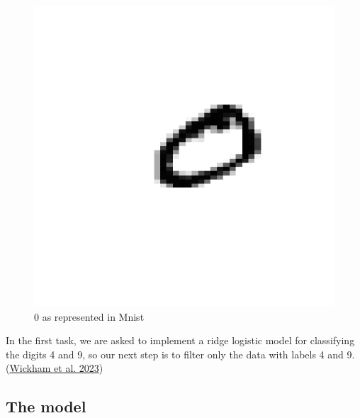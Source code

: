\documentclass[
  10pt,
]{article}
\newenvironment{Shaded}{\begin{snugshade}}{\end{snugshade}}
\newcommand{\CommentTok}[1]{\textcolor[rgb]{0.56,0.35,0.01}{\textit{#1}}}
\newcommand{\DecValTok}[1]{\textcolor[rgb]{0.00,0.00,0.81}{#1}}
\newcommand{\FunctionTok}[1]{\textcolor[rgb]{0.13,0.29,0.53}{\textbf{#1}}}
\newcommand{\NormalTok}[1]{#1}
\newcommand{\OtherTok}[1]{\textcolor[rgb]{0.56,0.35,0.01}{#1}}
\newcommand{\SpecialCharTok}[1]{\textcolor[rgb]{0.81,0.36,0.00}{\textbf{#1}}}
\begin{document}
\begin{figure}

{\centering \includegraphics{Task1_files/figure-latex/plot2-1} 

}

\caption{0 as represented in Mnist}\label{fig:plot2}
\end{figure}

In the first task, we are asked to implement a ridge logistic model for
classifying the digits 4 and 9, so our next step is to filter only the
data with labels 4 and 9. (\protect\hyperlink{ref-dplyr}{Wickham et al.
2023})

\begin{Shaded}
\end{Shaded}

\hypertarget{the-model}{%
\subsection{The model}\label{the-model}}
\end{document}
